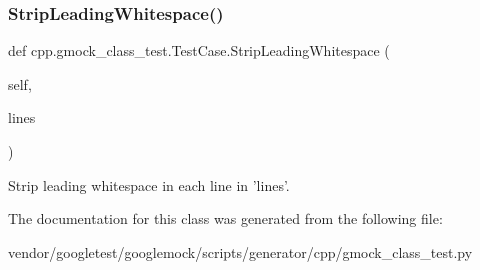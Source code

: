 \subsubsection{\texorpdfstring{Strip\+Leading\+Whitespace()}{StripLeadingWhitespace()}}
{\footnotesize\ttfamily def cpp.\+gmock\+\_\+class\+\_\+test.\+Test\+Case.\+Strip\+Leading\+Whitespace (\begin{DoxyParamCaption}\item[{}]{self,  }\item[{}]{lines }\end{DoxyParamCaption})}

\begin{DoxyVerb}Strip leading whitespace in each line in 'lines'.\end{DoxyVerb}
 

The documentation for this class was generated from the following file\+:\begin{DoxyCompactItemize}
\item 
vendor/googletest/googlemock/scripts/generator/cpp/gmock\+\_\+class\+\_\+test.\+py\end{DoxyCompactItemize}
